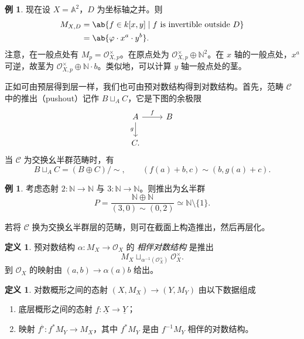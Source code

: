\documentclass{amsart}
\theoremstyle{definition}
\newtheorem{defn}[thm]{定义}
\newtheorem{exm}[thm]{例}
\theoremstyle{remark}
\theoremstyle{plain}
\theoremstyle{definition}
\theoremstyle{remark}
\newcommand{\A}{\mathbb{A}}
\newcommand{\N}{\mathbb{N}}
\newcommand{\mc}[1]{\mathcal{#1}}
\newcommand{\ul}[1]{\underline{#1}}
\newcommand{\1}{\mathbf{1}}
\newcommand{\2}{\mathbf{2}}
\newcommand{\3}{\mathbf{3}}
\begin{document}
\begin{exm}
    现在设 \(X = \A^2\)，\(D\) 为坐标轴之并。则
    \begin{align*}
        M_{X,D} &= \ab\{f \in k[x,y] \mid f \text{ is invertible outside } D \} \\
        &= \ab\{\varphi \cdot x^a \cdot y^b\}.
    \end{align*}
    注意，在一般点处有 \(M_p = \mc{O}_{X,p}^{\times}\)。在原点处为 \(\mc{O}_{X,p}^{\times}\oplus \N^2\)。在 \(x\) 轴的一般点处，\(x^a\) 可逆，故茎为 \(\mc{O}_{X,p}^{\times}\oplus \N \cdot b\)。类似地，可以计算 \(y\) 轴一般点处的茎。   
\end{exm}

正如可由预层得到层一样，我们也可由预对数结构得到对数结构。首先，范畴 \(\mc{C}\) 中的推出（pushout）记作 \(B \sqcup_A C\)，它是下图的余极限
\begin{equation*}
\begin{tikzcd}
    A \ar{r}{f} \ar{d}[swap]{g} & B \\
    C.
\end{tikzcd}
\end{equation*}
当 \(\mc{C}\) 为交换幺半群范畴时，有
\[ B \sqcup_A C = (B \oplus C)/\sim, \qquad (f(a) + b, c) \sim (b, g(a)+c). \]

\begin{exm}
    考虑态射 \(2 \colon \N \to \N\) 与 \(3 \colon \N \to \N\)。则推出为幺半群
    \[ P = \frac{\N \oplus \N}{(3, 0) \sim (0,2)} \simeq \N \setminus \{1\}. \]
\end{exm}

若将 \(\mc{C}\) 换为交换幺半群层的范畴，则可在截面上构造推出，然后再层化。

\begin{defn}
    预对数结构 \(\alpha \colon M_X \to \mc{O}_X\) 的 \textit{相伴对数结构} 是推出 
    \[ M_X \sqcup_{\alpha^{-1}(\mc{O}_X^{\times})} \mc{O}_X^{\times}. \]
    到 \(\mc{O}_X\) 的映射由 \((a,b) \to \alpha(a) b\) 给出。 
\end{defn}

\begin{defn}
    对数概形之间的态射 \((X, M_X) \to (Y, M_Y)\) 由以下数据组成
    \begin{enumerate}
        \item 底层概形之间的态射 \(\ul{f} \colon \ul{X} \to \ul{Y}\)；
        \item 映射 \(f^{\flat} \colon f^* M_Y \to M_X\)，其中 \(f^* M_Y\) 是由 \(f^{-1} M_Y\) 相伴的对数结构。  
    \end{enumerate}
\end{defn}
\end{document}
